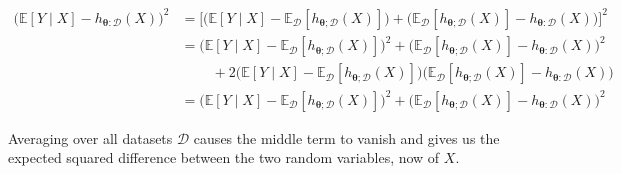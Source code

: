 \documentclass{article}
\begin{document}
      \begin{align*}
        \big(\mathbb{E}[Y \mid X] - h_{{\boldsymbol{\theta}}:\mathcal{D}} (X) \big)^2 & =  \big[ \big( \mathbb{E}[Y \mid X] - \mathbb{E}_\mathcal{D} [h_{{\boldsymbol{\theta}}; \mathcal{D}} (X)] \big) + \big( \mathbb{E}_\mathcal{D} [h_{{\boldsymbol{\theta}}; \mathcal{D}} (X)] - h_{{\boldsymbol{\theta}}:\mathcal{D}} (X) \big) \big]^2 \\
        & = \big( \mathbb{E}[Y \mid X] - \mathbb{E}_\mathcal{D} [h_{{\boldsymbol{\theta}}; \mathcal{D}} (X)] \big)^2 + \big( \mathbb{E}_\mathcal{D} [h_{{\boldsymbol{\theta}}; \mathcal{D}} (X)] - h_{{\boldsymbol{\theta}}:\mathcal{D}} (X) \big)^2 \\
        & \;\;\;\;\;\;\;\; + 2 \big( \mathbb{E}[Y \mid X] - \mathbb{E}_\mathcal{D} [h_{{\boldsymbol{\theta}}; \mathcal{D}} (X)] \big) \big( \mathbb{E}_\mathcal{D} [h_{{\boldsymbol{\theta}}; \mathcal{D}} (X)] - h_{{\boldsymbol{\theta}}:\mathcal{D}} (X) \big) \\
        & = \big( \mathbb{E}[Y \mid X] - \mathbb{E}_\mathcal{D} [h_{{\boldsymbol{\theta}}; \mathcal{D}} (X)] \big)^2 + \big( \mathbb{E}_\mathcal{D} [h_{{\boldsymbol{\theta}}; \mathcal{D}} (X)] - h_{{\boldsymbol{\theta}}:\mathcal{D}} (X) \big)^2 
      \end{align*}

      Averaging over all datasets $\mathcal{D}$ causes the middle term to vanish and gives us the expected squared difference between the two random variables, now of $X$. 
\end{document}

